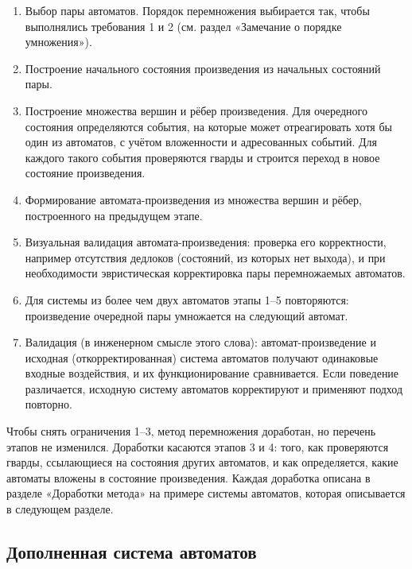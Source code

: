 \documentclass[12pt]{article}
\begin{document}
\begin{enumerate}
\item Выбор пары автоматов. Порядок перемножения выбирается так, чтобы выполнялись требования 1 и 2 (см. раздел «Замечание о порядке умножения»).
\item Построение начального состояния произведения из начальных состояний пары.
\item Построение множества вершин и рёбер произведения. Для очередного состояния определяются события, на которые может отреагировать хотя бы один из автоматов, с учётом вложенности и адресованных событий. Для каждого такого события проверяются гварды и строится переход в новое состояние произведения.
\item Формирование автомата-произведения из множества вершин и рёбер, построенного на предыдущем этапе.
\item Визуальная валидация автомата-произведения: проверка его корректности, например отсутствия дедлоков (состояний, из которых нет выхода), и при необходимости эвристическая корректировка пары перемножаемых автоматов.
\item Для системы из более чем двух автоматов этапы 1–5 повторяются: произведение очередной пары умножается на следующий автомат.
\item Валидация (в инженерном смысле этого слова): автомат-произведение и исходная (откорректированная) система автоматов получают одинаковые входные воздействия, и их функционирование сравнивается. Если поведение различается, исходную систему автоматов корректируют и применяют подход повторно.
\end{enumerate}

Чтобы снять ограничения 1–3, метод перемножения доработан, но перечень этапов не изменился. Доработки касаются этапов 3 и 4: того, как проверяются гварды, ссылающиеся на состояния других автоматов, и как определяется, какие автоматы вложены в состояние произведения. Каждая доработка описана в разделе «Доработки метода» на примере системы автоматов, которая описывается в следующем разделе.

\subsection*{Дополненная система автоматов}
\end{document}
